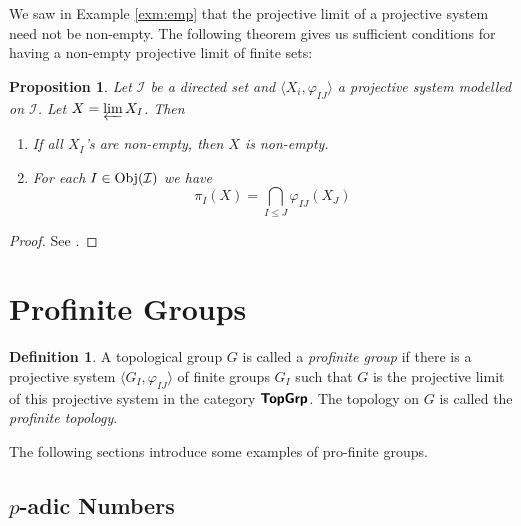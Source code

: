 \documentclass[12pt]{article}
\newtheorem{prop}[thm]{Proposition}
\theoremstyle{definition}
\newtheorem{dfn}[thm]{Definition}
\theoremstyle{remark}
\newcommand{\catvar}[1]{\mathcal{#1}}
\newcommand{\II}{\catvar{I}}
\newcommand{\catname}[1]{\textup{\sffamily\textbf{#1}}}
\newcommand{\Obj}[1]{\textup{Obj}(#1)}
\begin{document}
    We saw in Example \ref{exm:emp} that the projective limit of a projective system need not be non-empty. The following theorem gives us sufficient conditions for having a non-empty projective limit of finite sets:
    
    \begin{prop}
        Let $\II$ be a directed set and $\langle X_i,\varphi_{IJ}\rangle$ a projective system modelled on $\II$. Let $X=\varprojlim X_I$. Then
        \begin{enumerate}[label=(\roman*)]
            \item If all $X_I$'s are non-empty, then $X$ is non-empty.
            \item For each $I\in\Obj{\II}$ we have
            $$ \pi_I(X) =\bigcap_{I\leq J}\varphi_{IJ}(X_J) $$
        \end{enumerate}
    \end{prop}

    \begin{proof}
        See \cite[Proposition 1-11]{FANF1999}.
    \end{proof}

    \section{Profinite Groups}

    \begin{dfn}
        A topological group $G$ is called a \emph{profinite group} if there is a projective system $\langle G_I,\varphi_{IJ}\rangle$ of finite groups $G_I$ such that $G$ is the projective limit of this projective system in the category $\catname{TopGrp}$. The topology on $G$ is called the \emph{profinite topology}.
    \end{dfn}

    The following sections introduce some examples of pro-finite groups.

    \subsection{\texorpdfstring{$p$}{p}-adic Numbers}

    
\end{document}
